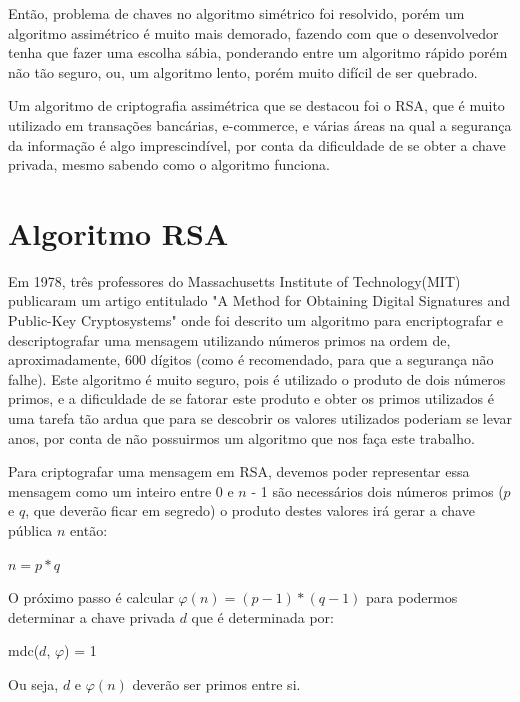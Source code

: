 \documentclass[12pt]{article}
\begin{document}
Ent\~{a}o, problema de chaves no algoritmo sim\'{e}trico foi resolvido, por\'{e}m um algoritmo assim\'{e}trico \'{e} muito mais demorado, fazendo com que o desenvolvedor tenha que fazer uma escolha s\'{a}bia, ponderando entre um algoritmo r\'{a}pido por\'{e}m n\~{a}o t\~{a}o seguro, ou, um algoritmo lento, por\'{e}m muito dif\'{i}cil de ser quebrado. 

Um algoritmo de criptografia assim\'{e}trica que se destacou foi o RSA, que \'{e} muito utilizado em transa\c c\~{o}es banc\'{a}rias, e-commerce, e v\'{a}rias \'{a}reas na qual a seguran\c ca da informa\c c\~{a}o \'{e} algo imprescind\'{i}vel, por conta da dificuldade de se obter a chave privada, mesmo sabendo como o algoritmo funciona.


 
\section{Algoritmo RSA}

Em 1978, tr\^{e}s professores do Massachusetts Institute of Technology(MIT) publicaram um artigo entitulado "A Method for Obtaining Digital Signatures and Public-Key Cryptosystems"\cite{rivest:1978} onde foi descrito um algoritmo para encriptografar e descriptografar uma mensagem utilizando n\'{u}meros primos na ordem de, aproximadamente, 600 d\'{i}gitos (como \'{e} recomendado, para que a seguran\c ca n\~{a}o falhe). Este algoritmo \'{e} muito seguro, pois \'{e} utilizado o produto de dois n\'{u}meros primos, e a dificuldade de se fatorar este produto e obter os primos utilizados \'{e} uma tarefa t\~{a}o ardua que para se descobrir os valores utilizados poderiam se levar anos, por conta de n\~{a}o possuirmos um algoritmo que nos fa\c ca este trabalho.

Para criptografar uma mensagem em RSA, devemos poder representar essa mensagem como um inteiro entre 0 e $n$ - 1 s\~{a}o necess\'{a}rios dois n\'{u}meros primos ($p$ e $q$, que dever\~{a}o ficar em segredo) o produto destes valores ir\'{a} gerar a chave p\'{u}blica $n$ ent\~{a}o:
\begin{center}
$n = p * q$
\end{center}

O pr\'{o}ximo passo \'{e} calcular $\varphi(n) = (p - 1) * (q - 1)$ para podermos determinar a chave privada $d$ que \'{e} determinada por:
\begin{center}
mdc($d$, $\varphi$) = 1
\end{center}
Ou seja, $d$ e $\varphi(n)$ dever\~{a}o ser primos entre si.
\end{document}
